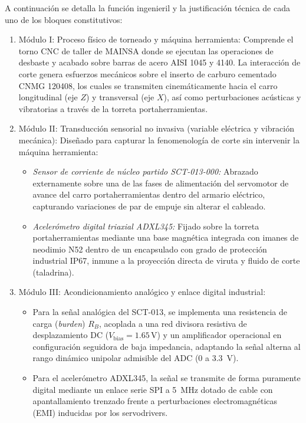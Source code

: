 A continuación se detalla la función ingenieril y la justificación técnica de cada uno de los bloques constitutivos:

\begin{enumerate}[leftmargin=0.8cm]
    \item Módulo I: Proceso físico de torneado y máquina herramienta: Comprende el torno CNC de taller de MAINSA donde se ejecutan las operaciones de desbaste y acabado sobre barras de acero AISI 1045 y 4140. La interacción de corte genera esfuerzos mecánicos sobre el inserto de carburo cementado CNMG 120408, los cuales se transmiten cinemáticamente hacia el carro longitudinal (eje $Z$) y transversal (eje $X$), así como perturbaciones acústicas y vibratorias a través de la torreta portaherramientas.
    
    \item Módulo II: Transducción sensorial no invasiva (variable eléctrica y vibración mecánica): Diseñado para capturar la fenomenología de corte sin intervenir la máquina herramienta:
    \begin{itemize}
        \item \textit{Sensor de corriente de núcleo partido SCT-013-000:} Abrazado externamente sobre una de las fases de alimentación del servomotor de avance del carro portaherramientas dentro del armario eléctrico, capturando variaciones de par de empuje sin alterar el cableado.
        \item \textit{Acelerómetro digital triaxial ADXL345:} Fijado sobre la torreta portaherramientas mediante una base magnética integrada con imanes de neodimio N52 dentro de un encapsulado con grado de protección industrial IP67, inmune a la proyección directa de viruta y fluido de corte (taladrina).
    \end{itemize}
    
    \item Módulo III: Acondicionamiento analógico y enlace digital industrial:
    \begin{itemize}
        \item Para la señal analógica del SCT-013, se implementa una resistencia de carga (\textit{burden}) $R_B$, acoplada a una red divisora resistiva de desplazamiento DC ($V_{\text{bias}} = 1.65\,\text{V}$) y un amplificador operacional en configuración seguidora de baja impedancia, adaptando la señal alterna al rango dinámico unipolar admisible del ADC (0 a 3.3~V).
        \item Para el acelerómetro ADXL345, la señal se transmite de forma puramente digital mediante un enlace serie SPI a 5~MHz dotado de cable con apantallamiento trenzado frente a perturbaciones electromagnéticas (EMI) inducidas por los servodrivers.
    \end{itemize}
    

\end{enumerate}
